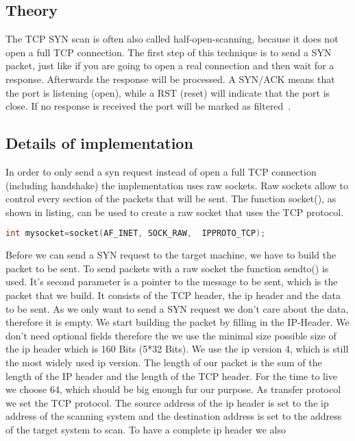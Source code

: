 \subsection{Theory}
The TCP SYN scan is often also called half-open-scanning, because it does not open a full TCP connection. The first step of this technique is to send a SYN packet, just like if you are
going to open a real connection and then wait for a response. Afterwards the response will be processed. A SYN/ACK means that the port is listening (open), while a RST (reset) will indicate
that the port is close. If no response is received the port will be marked as filtered~\cite{nmap2009}. 



\subsection{Details of implementation}
In order to only send a syn request instead of open a full TCP connection (including handshake) the implementation uses raw sockets. Raw sockets allow to control
every section of the packets that will be sent. The function socket(), as shown in listing, can be used to create a raw socket that uses the TCP protocol.
\begin{lstlisting}[frame= single, language=C, caption= C code to use the connect() to check if port is open]
int mysocket=socket(AF_INET, SOCK_RAW,  IPPROTO_TCP);
\end{lstlisting}
Before we can send a SYN request to the target machine, we have to build the packet to be sent. To send packets with a raw socket the function sendto() is used.
It's second parameter is a pointer to the message to be sent, which 
is the packet that we build. It consists of the TCP header, the ip header and the data
to be sent. As we only want to send a SYN request we don't care about the data, therefore it is empty. We start building the packet by filling in the IP-Header. We don't need optional fields therefore the we use the minimal size possible size of the ip header which is 160 Bits (5*32 Bits). We use the ip version 4, which is still the most widely used ip version. The length of our packet
is the sum of the length of the IP header and the length of the TCP header. For the time to live we choose 64, which should be big enough
fur our purpose. As transfer protocol we set the TCP protocol. The source address of the ip header is set to the ip address of the scanning system and the destination address is set to the address of the target system to scan. To have a complete ip header we also

